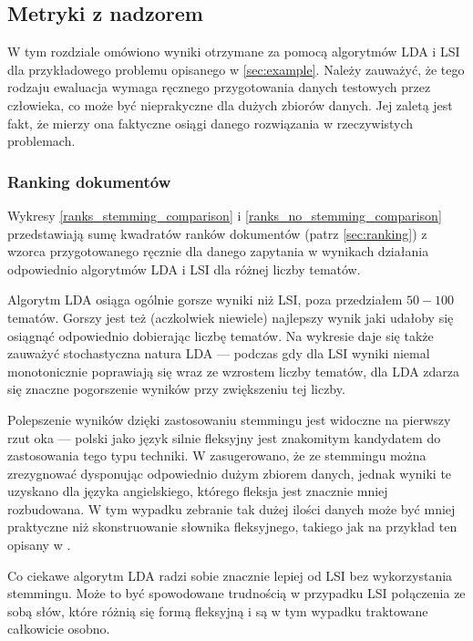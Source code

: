 \documentclass[11pt,a4paper]{article}
\begin{document}
\FloatBarrier

\subsection{Metryki z nadzorem}

W tym rozdziale omówiono wyniki otrzymane za pomocą algorytmów LDA i LSI dla
przykładowego problemu opisanego w \ref{sec:example}. Należy zauważyć, że tego
rodzaju ewaluacja wymaga ręcznego przygotowania danych testowych przez
człowieka, co może być nieprakyczne dla dużych zbiorów danych.  Jej zaletą jest
fakt, że mierzy ona faktyczne osiągi danego rozwiązania w rzeczywistych
problemach.

\subsubsection{Ranking dokumentów}

Wykresy \ref{ranks_stemming_comparison} i \ref{ranks_no_stemming_comparison}
przedstawiają sumę kwadratów ranków dokumentów (patrz \ref{sec:ranking}) z
wzorca przygotowanego ręcznie dla danego zapytania w wynikach działania
odpowiednio algorytmów LDA i LSI dla różnej liczby tematów.

Algorytm LDA osiąga ogólnie gorsze wyniki niż LSI, poza przedziałem $50 - 100$
tematów. Gorszy jest też (aczkolwiek niewiele) najlepszy wynik jaki udałoby się
osiągnąć odpowiednio dobierając liczbę tematów. Na wykresie daje się także
zauważyć stochastyczna natura LDA --- podczas gdy dla LSI wyniki niemal
monotonicznie poprawiają się wraz ze wzrostem liczby tematów, dla LDA zdarza się
znaczne pogorszenie wyników przy zwiększeniu tej liczby.

Polepszenie wyników dzięki zastosowaniu stemmingu jest widoczne na pierwszy
rzut oka --- polski jako język silnie fleksyjny jest znakomitym kandydatem do
zastosowania tego typu techniki. W \cite{manning-schuetze} zasugerowano, że ze
stemmingu można zrezygnować dysponując odpowiednio dużym zbiorem danych, jednak
wyniki te uzyskano dla języka angielskiego, którego fleksja jest znacznie mniej
rozbudowana. W tym wypadku zebranie tak dużej ilości danych może być mniej
praktyczne niż skonstruowanie słownika fleksyjnego, takiego jak na przykład ten
opisany w \cite{lubaszewski-slownik}.

Co ciekawe algorytm LDA radzi sobie znacznie lepiej od LSI bez wykorzystania
stemmingu.  Może to być spowodowane trudnością w przypadku LSI połączenia ze
sobą słów, które różnią się formą fleksyjną i są w tym wypadku traktowane
całkowicie osobno.
\end{document}
